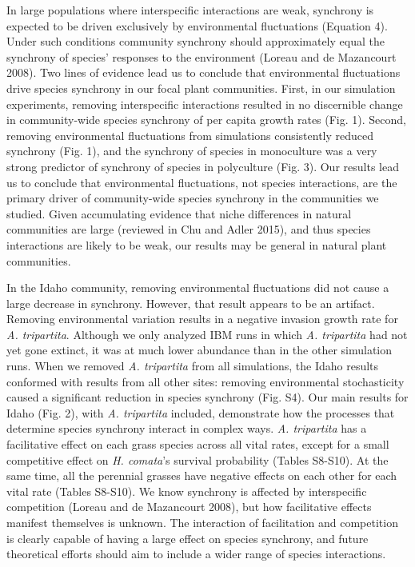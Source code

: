 \documentclass[12pt,]{article}
\begin{document}
In large populations where interspecific interactions are weak,
synchrony is expected to be driven exclusively by environmental
fluctuations (Equation 4). Under such conditions community synchrony
should approximately equal the synchrony of species' responses to the
environment (Loreau and {{de Mazancourt}} 2008). Two lines of evidence
lead us to conclude that environmental fluctuations drive species
synchrony in our focal plant communities. First, in our simulation
experiments, removing interspecific interactions resulted in no
discernible change in community-wide species synchrony of per capita
growth rates (Fig. 1). Second, removing environmental fluctuations from
simulations consistently reduced synchrony (Fig. 1), and the synchrony
of species in monoculture was a very strong predictor of synchrony of
species in polyculture (Fig. 3). Our results lead us to conclude that
environmental fluctuations, not species interactions, are the primary
driver of community-wide species synchrony in the communities we
studied. Given accumulating evidence that niche differences in natural
communities are large (reviewed in Chu and Adler 2015), and thus species
interactions are likely to be weak, our results may be general in
natural plant communities.

In the Idaho community, removing environmental fluctuations did not
cause a large decrease in synchrony. However, that result appears to be
an artifact. Removing environmental variation results in a negative
invasion growth rate for \emph{A. tripartita}. Although we only analyzed
IBM runs in which \emph{A. tripartita} had not yet gone extinct, it was
at much lower abundance than in the other simulation runs. When we
removed \emph{A. tripartita} from all simulations, the Idaho results
conformed with results from all other sites: removing environmental
stochasticity caused a significant reduction in species synchrony (Fig.
S4). Our main results for Idaho (Fig. 2), with \emph{A. tripartita}
included, demonstrate how the processes that determine species synchrony
interact in complex ways. \emph{A. tripartita} has a facilitative effect
on each grass species across all vital rates, except for a small
competitive effect on \emph{H. comata}'s survival probability (Tables
S8-S10). At the same time, all the perennial grasses have negative
effects on each other for each vital rate (Tables S8-S10). We know
synchrony is affected by interspecific competition (Loreau and {{de
Mazancourt}} 2008), but how facilitative effects manifest themselves is
unknown. The interaction of facilitation and competition is clearly
capable of having a large effect on species synchrony, and future
theoretical efforts should aim to include a wider range of species
interactions.
\end{document}
